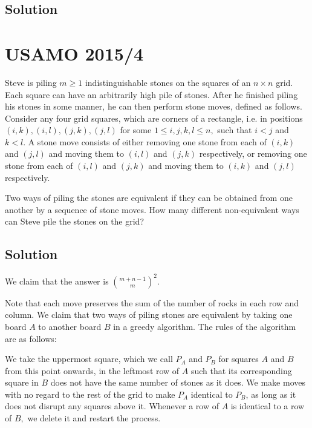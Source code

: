 \documentclass[mast]{lucky}
\begin{document}
\subsection{Solution}

\pagebreak\section{USAMO 2015/4}

Steve is piling $m \geq 1$ indistinguishable stones on the squares of an $n \times n$ grid. Each square can have an arbitrarily high pile of stones. After he finished piling his stones in some manner, he can then perform stone moves, defined as follows. Consider any four grid squares, which are corners of a rectangle, i.e. in positions $(i, k),(i, l),(j, k),(j, l)$ for some $1 \leq i, j, k, l \leq n,$ such that $i<j$ and $k<l .$ A stone move consists of either removing one stone from each of $(i, k)$ and $(j, l)$ and moving them to $(i, l)$ and $(j, k)$ respectively, or removing one stone from each of $(i, l)$ and $(j, k)$ and moving them to $(i, k)$ and $(j, l)$ respectively.

Two ways of piling the stones are equivalent if they can be obtained from one another by a sequence of stone moves. How many different non-equivalent ways can Steve pile the stones on the grid?

\subsection{Solution}

We claim that the answer is $\binom{m+n-1}{m}^2.$

Note that each move preserves the sum of the number of rocks in each row and column. We claim that two ways of piling stones are equivalent by taking one board $A$ to another board $B$ in a greedy algorithm. The rules of the algorithm are as follows:

\begin{itemize}
\Item We take the uppermost square, which we call $P_A$ and $P_B$ for squares $A$ and $B$ from this point onwards, in the leftmost row of $A$ such that its corresponding square in $B$ does not have the same number of stones as it does.
\Item We make moves with no regard to the rest of the grid to make $P_A$ identical to $P_B$, as long as it does not disrupt any squares above it.
\Item Whenever a row of $A$ is identical to a row of $B,$ we delete it and restart the process.
\end{itemize}
\end{document}
